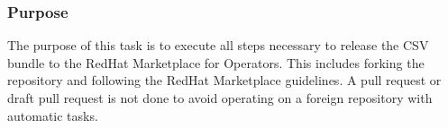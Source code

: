 \subsubsection{Purpose}\label{subsubsec:release-redhat-marketplace-Purpose}

The purpose of this task is to execute all steps necessary to release the CSV bundle to the RedHat Marketplace for Operators.
This includes forking the repository and following the RedHat Marketplace guidelines.
A pull request or draft pull request is not done to avoid operating on a foreign repository with automatic tasks.
